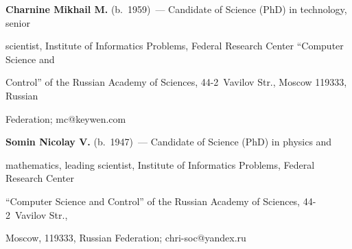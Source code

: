 \Contr



\noindent

\textbf{Charnine Mikhail M.} (b.\ 1959)~--- Candidate of Science (PhD) in technology, senior 

scientist, Institute of Informatics Problems, Federal Research Center ``Computer Science and 

Control'' of the Russian Academy of Sciences, 44-2~Vavilov Str., Moscow 119333, Russian 

Federation; \mbox{mc@keywen.com} 



\vspace*{1pt}



\noindent

\textbf{Somin Nicolay V.} (b.\ 1947)~--- Candidate of Science (PhD) in physics and 

mathematics, leading scientist, Institute of Informatics Problems, Federal Research Center 

``Computer Science and Control'' of the Russian Academy of Sciences, 44-2~Vavilov Str., 

Moscow, 119333, Russian Federation; \mbox{chri-soc@yandex.ru}

\label{end\stat}





\renewcommand{\bibname}{\protect\rm Литература}

